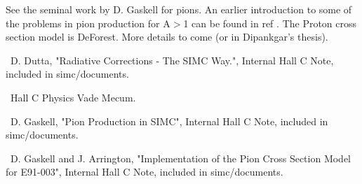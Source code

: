 See the seminal work by D. Gaskell\cite{gaskellpion} for pions.  An earlier
introduction to some of the problems in pion production for A$>$1 can be found
in ref \cite{pionagt1}.  The Proton cross section model is DeForest.  More
details to come (or in Dipankgar's thesis).


\begin{thebibliography}{99}

\ D. Dutta, "Radiative Corrections - The SIMC Way.", Internal Hall C Note, included in simc/documents.

\ Hall C Physics Vade Mecum.

\ D. Gaskell, "Pion Production in SIMC", Internal Hall C Note, included in simc/documents.

\ D. Gaskell and J. Arrington, "Implementation of the Pion Cross Section Model
for E91-003", Internal Hall C Note, included in simc/documents.

\end{thebibliography}


